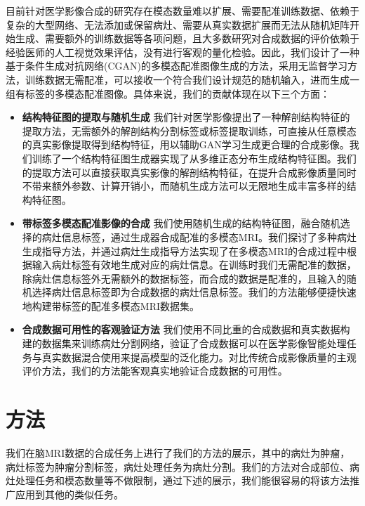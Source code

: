 \documentclass[letterpaper]{article} %
\begin{document}
目前针对医学影像合成的研究存在模态数量难以扩展、需要配准训练数据、依赖于复杂的大型网络、无法添加或保留病灶、需要从真实数据扩展而无法从随机矩阵开始生成、需要额外的训练数据等各项问题，且大多数研究对合成数据的评价依赖于经验医师的人工视觉效果评估，没有进行客观的量化检验。因此，我们设计了一种基于条件生成对抗网络(CGAN)\cite{70mirza2014conditional}的多模态配准图像生成的方法，采用无监督学习方法，训练数据无需配准，可以接收一个符合我们设计规范的随机输入，进而生成一组有标签的多模态配准图像。具体来说，我们的贡献体现在以下三个方面：
\begin{itemize}
\item \textbf{结构特征图的提取与随机生成}
我们针对医学影像提出了一种解剖结构特征的提取方法，无需额外的解剖结构分割标签或标签提取训练，可直接从任意模态的真实影像提取得到结构特征，用以辅助GAN学习生成更合理的合成影像。我们训练了一个结构特征图生成器实现了从多维正态分布生成结构特征图。我们的提取方法可以直接获取真实影像的解剖结构特征，在提升合成影像质量同时不带来额外参数、计算开销小，而随机生成方法可以无限地生成丰富多样的结构特征图。
\item \textbf{带标签多模态配准影像的合成}
我们使用随机生成的结构特征图，融合随机选择的病灶信息标签，通过生成器合成配准的多模态MRI。我们探讨了多种病灶生成指导方法，并通过病灶生成指导方法实现了在多模态MRI的合成过程中根据输入病灶标签有效地生成对应的病灶信息。在训练时我们无需配准的数据，除病灶信息标签外无需额外的数据标签，而合成的数据是配准的，且输入的随机选择病灶信息标签即为合成数据的病灶信息标签。我们的方法能够便捷快速地构建带标签的配准多模态MRI数据集。
\item \textbf{合成数据可用性的客观验证方法}
我们使用不同比重的合成数据和真实数据构建的数据集来训练病灶分割网络，验证了合成数据可以在医学影像智能处理任务与真实数据混合使用来提高模型的泛化能力。对比传统合成影像质量的主观评价方法，我们的方法能客观真实地验证合成数据的可用性。
\end{itemize}

\section{方法}
我们在脑MRI数据的合成任务上进行了我们的方法的展示，其中的病灶为肿瘤，病灶标签为肿瘤分割标签，病灶处理任务为病灶分割。我们的方法对合成部位、病灶处理任务和模态数量等不做限制，通过下述的展示，我们能很容易的将该方法推广应用到其他的类似任务。
\end{document}
